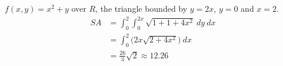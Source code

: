 {$f(x,y) = x^2+y$ over $R$, the triangle bounded by $y=2x$, $y=0$ and $x=2$.
}
{
\begin{align*}SA &= \int_{0}^{2}\int_{0}^{2x} \sqrt{1+ 1+4x^2}\ dy\ dx\\
		&= \int_0^{2}\big(2x\sqrt{2+4x^2}\big)\ dx \\
		&= \frac{26}{3}\sqrt{2}\approx 12.26
\end{align*}
}